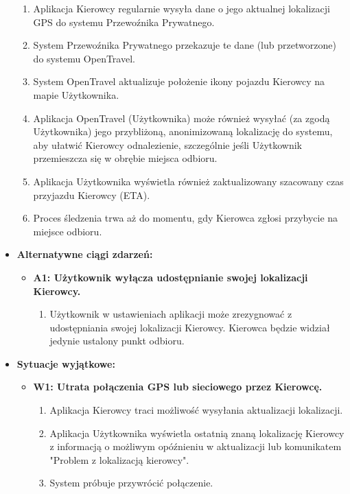 \documentclass[a4paper,12pt]{article}
\begin{document}
\begin{itemize}
\begin{enumerate}
            \item Aplikacja Kierowcy regularnie wysyła dane o jego aktualnej lokalizacji GPS do systemu Przewoźnika Prywatnego.
            \item System Przewoźnika Prywatnego przekazuje te dane (lub przetworzone) do systemu OpenTravel.
            \item System OpenTravel aktualizuje położenie ikony pojazdu Kierowcy na mapie Użytkownika.
            \item Aplikacja OpenTravel (Użytkownika) może również wysyłać (za zgodą Użytkownika) jego przybliżoną, anonimizowaną lokalizację do systemu, aby ułatwić Kierowcy odnalezienie, szczególnie jeśli Użytkownik przemieszcza się w obrębie miejsca odbioru.
            \item Aplikacja Użytkownika wyświetla również zaktualizowany szacowany czas przyjazdu Kierowcy (ETA).
            \item Proces śledzenia trwa aż do momentu, gdy Kierowca zgłosi przybycie na miejsce odbioru.
        \end{enumerate}
    \item \textbf{Alternatywne ciągi zdarzeń:}
        \begin{itemize}
            \item \textbf{A1: Użytkownik wyłącza udostępnianie swojej lokalizacji Kierowcy.}
                \begin{enumerate}
                    \item Użytkownik w ustawieniach aplikacji może zrezygnować z udostępniania swojej lokalizacji Kierowcy. Kierowca będzie widział jedynie ustalony punkt odbioru.
                \end{enumerate}
        \end{itemize}
    \item \textbf{Sytuacje wyjątkowe:}
        \begin{itemize}
            \item \textbf{W1: Utrata połączenia GPS lub sieciowego przez Kierowcę.}
                \begin{enumerate}
                    \item Aplikacja Kierowcy traci możliwość wysyłania aktualizacji lokalizacji.
                    \item Aplikacja Użytkownika wyświetla ostatnią znaną lokalizację Kierowcy z informacją o możliwym opóźnieniu w aktualizacji lub komunikatem "Problem z lokalizacją kierowcy".
                    \item System próbuje przywrócić połączenie.

\end{enumerate}
\end{itemize}
\end{itemize}
\end{document}
